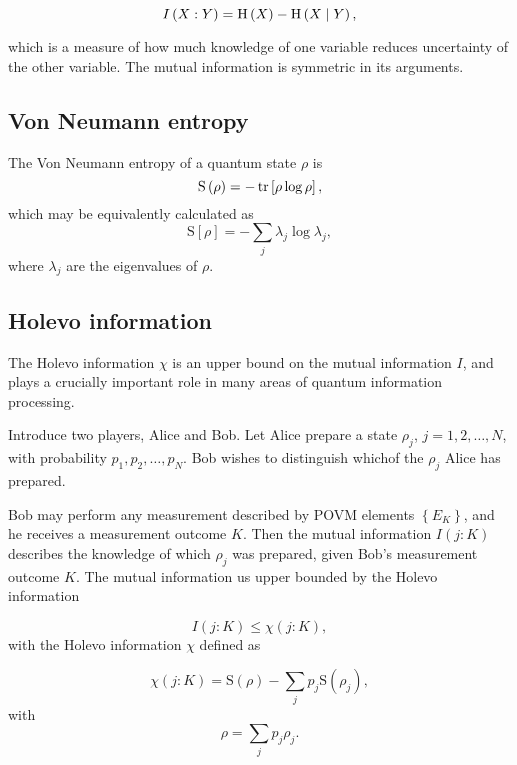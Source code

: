 \begin{equation}
I\left(X : Y\right) = \text{H}\left(X\right) - \text{H}\left(X \; \middle| \; Y\right),
\end{equation}

\noindent which is a measure of how much knowledge of one variable reduces uncertainty of the other variable. The mutual information is symmetric in its arguments.


\FloatBarrier
\subsection{Von Neumann entropy}
The Von Neumann entropy of a quantum state $\rho$ is
\begin{equation}
\text{S}\left(\rho\right) = - \tr\left[\rho \log \rho \right],
\end{equation}
which may be equivalently calculated as
\begin{equation}
\text{S}\left[\rho\right] = - \sum_j \lambda_j \log \lambda_j,
\end{equation}
where $\lambda_j$ are the eigenvalues of $\rho$.


\FloatBarrier
\subsection{Holevo information}
The Holevo information $\chi$ is an upper bound on the mutual information $I$, and plays a crucially important role in many areas of quantum information processing. 

Introduce two players, Alice and Bob. Let Alice prepare a state $\rho_j$, $j = 1, 2, \dots, N$, with probability $p_1, p_2, \dots, p_N$. Bob wishes to distinguish whichof the $\rho_j$ Alice has prepared. 

Bob may perform any measurement described by POVM elements $\left\{E_K\right\}$, and he receives a measurement outcome $K$. Then the mutual information $I\left(j : K\right)$ describes the knowledge of which $\rho_j$ was prepared, given Bob's measurement outcome $K$. The mutual information us upper bounded by the Holevo information

\begin{equation}\label{eqn:intro_holevo_bound}
I\left(j : K \right) \le \chi \left(j : K \right),
\end{equation}
with the Holevo information $\chi$ defined as

\begin{equation}\label{eqn:intro_holevo}
\chi\left(j : K\right)  = \text{S}\left(\rho\right) - \sum_j p_j \text{S}\left(\rho_j\right),
\end{equation}
with
\begin{equation}
\rho = \sum_j p_j \rho_j.
\end{equation}

